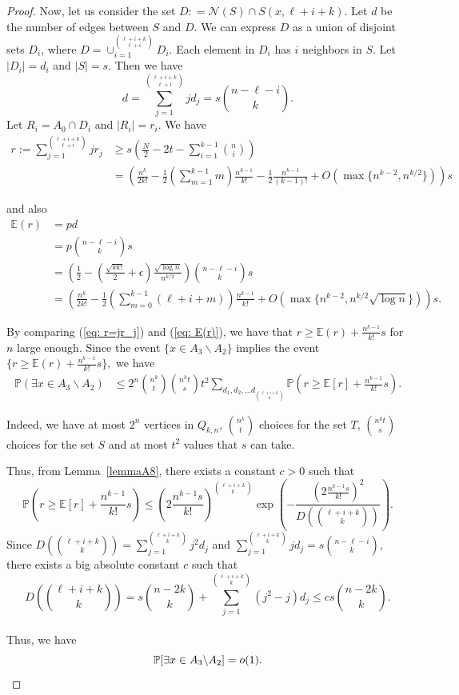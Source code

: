 \documentclass[reqno,11pt]{amsart}
\renewcommand{\leq}{\leqslant}
\renewcommand{\geq}{\geqslant}
\begin{document}
\begin{proof}
Now, let us consider the set $D: = \mathcal{N}(S) \cap S(x,\ell+i+k)$. Let $d$ be the number of edges between $S$ and $D$. We can express $D$ as a union of disjoint sets $D_i$, where $D = \cup_{i=1}^{\binom{\ell+i+k}{\ell+i}} D_i$. Each element in $D_i$ has $i$ neighbors in $S$. Let $|D_i|=d_i$ and $|S|=s$. Then we have 
$$d=\sum_{j=1}^{\binom{\ell+i+k}{\ell+i}}j d_j=s\binom{n-\ell-i}{k}.$$
Let $R_i=A_0 \cap D_i$ and $|R_i|=r_i$. We have
\begin{align}
        r:=\sum_{j=1}^{\binom{\ell+i+k}{\ell+i}}j r_j & \geq s\left(\frac{N}{2}-2t-\sum_{i=1}^{k-1}\binom{n}{i}\right) \\
        & = \left(\frac{n^k}{2k !}-\frac{1}{2}\left(\sum_{m=1}^{k-1}m \right)\frac{n^{k-1}}{k!}-\frac{1}{2}\frac{n^{k-1}}{(k-1)!} +O\left(\max\{n^{k-2},n^{k/2}\}\right)\right)s     \label{eq: r=jr_j}
\end{align}

and also
\begin{align}
\mathbb{E}(r) &=pd\\
&=p\binom{n-\ell-i}{k}s \\
&=\left(\frac{1}{2}-\left(\frac{\sqrt{kk!}}{2}+\epsilon \right) \frac{ \sqrt{\log n}}{n^{k/2}} \right)\binom{n-\ell-i}{k}s\\
&=\left(\frac{n^k}{2k!}- \frac{1}{2}\left(\sum_{m=0}^{k-1}(\ell+i+m)\right)\frac{n^{k-1}}{k!}+O\left( \max \{n^{k-2},n^{k/2} \sqrt{\log n}\}\right) \right)s. \label{eq: E(r)}
\end{align}


By comparing (\ref{eq: r=jr_j}) and (\ref{eq: E(r)}), we have that $r \geq \mathbb{E}(r)+\frac{n^{k-1}}{k!}s$ for $n$ large enough. Since the event $\{x \in A_3 \backslash A_2 \}$  implies the event $\{r \geq \mathbb{E}(r)+\frac{n^{k-1}}{k!}s\} ,$ we have 
\begin{align*}
    \mathbb{P}( \exists x \in A_3 \backslash A_2) & \leq 2^n \binom{n^k}{t} \binom{n^kt}{s}t^2\sum_{d_1,d_2,...d_{\binom{\ell+i+k}{k}}} \mathbb{P}\left(r \geq \mathbb{E}[r]+\frac{ n^{k-1}}{k!}s \right).
\end{align*}

Indeed, we have at most $2^n$ vertices in $Q_{k,n}$, $\binom{n^k}{t}$ choices for the set $T$, $\binom{n^kt}{s}$ choices for the set $S$ and at most $t^2$ values that $s$ can take.

Thus, from Lemma~\ref{lemmaA8}, there exists a constant $c >0$ such that 
$$\mathbb{P}\left(r \geq \mathbb{E}[r]+\frac{n^{k-1}}{k!}s \right) \leq \left(2\frac{n^{k-1}s}{k!} \right)^{\binom{\ell+i+k}{k}}\exp\left(- \frac{(2 \frac{n^{k-1}s}{k!})^2}{D\left(\binom{\ell+i+k}{k} \right)}\right).$$
Since $D\left(\binom{\ell+i+k}{k} \right)=\sum_{j=1}^{\binom{\ell+i+k}{k}} j^2d_j$ and $\sum_{j=1}^{\binom{\ell+i+k}{k}}j d_j=s\binom{n-\ell-i}{k}$, there exists a big absolute constant $c$ such that 
$$D\left(\binom{\ell+i+k}{k} \right)=s\binom{n-2k}{k}+\sum_{j=1}^{\binom{\ell+i+k}{k}}(j^2-j)d_j \leq cs\binom{n-2k}{k}.$$
\\
Thus, we have 
$$\mathbb{P}[\exists x \in A_3\backslash A_2] =o(1). \qedhere$$


\end{proof}
\end{document}
